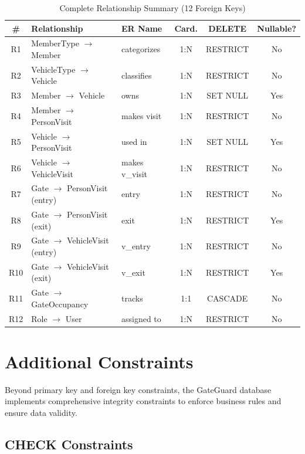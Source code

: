 \documentclass[a4paper, 12pt]{article}
\begin{document}
\begin{table}[H]
\centering
\caption{Complete Relationship Summary (12 Foreign Keys)}
\label{tab:rel-summary}
\small
\begin{tabularx}{\textwidth}{c l l c c c}
\toprule
\textbf{\#} & \textbf{Relationship} & \textbf{ER Name} & \textbf{Card.} & \textbf{DELETE} & \textbf{Nullable?} \\
\midrule
R1 & MemberType $\to$ Member & categorizes & 1:N & RESTRICT & No \\
R2 & VehicleType $\to$ Vehicle & classifies & 1:N & RESTRICT & No \\
R3 & Member $\to$ Vehicle & owns & 1:N & SET NULL & Yes \\
R4 & Member $\to$ PersonVisit & makes visit & 1:N & RESTRICT & No \\
R5 & Vehicle $\to$ PersonVisit & used in & 1:N & SET NULL & Yes \\
R6 & Vehicle $\to$ VehicleVisit & makes v\_visit & 1:N & RESTRICT & No \\
R7 & Gate $\to$ PersonVisit (entry) & entry & 1:N & RESTRICT & No \\
R8 & Gate $\to$ PersonVisit (exit) & exit & 1:N & RESTRICT & Yes \\
R9 & Gate $\to$ VehicleVisit (entry) & v\_entry & 1:N & RESTRICT & No \\
R10 & Gate $\to$ VehicleVisit (exit) & v\_exit & 1:N & RESTRICT & Yes \\
R11 & Gate $\to$ GateOccupancy & tracks & 1:1 & CASCADE & No \\
R12 & Role $\to$ User & assigned to & 1:N & RESTRICT & No \\
\bottomrule
\end{tabularx}
\end{table}

\newpage
\section{Additional Constraints}
\label{sec:constraints}

Beyond primary key and foreign key constraints, the GateGuard database implements comprehensive integrity constraints to enforce business rules and ensure data validity.

\subsection{CHECK Constraints}
\end{document}

